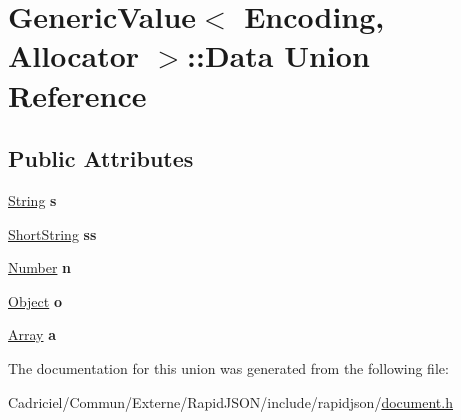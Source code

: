 \hypertarget{union_generic_value_1_1_data}{}\section{Generic\+Value$<$ Encoding, Allocator $>$\+:\+:Data Union Reference}
\label{union_generic_value_1_1_data}
\subsection*{Public Attributes}
\begin{DoxyCompactItemize}
\item 
\hyperlink{struct_generic_value_1_1_string}{String} {\bfseries s}\hypertarget{union_generic_value_1_1_data_a6872a4b93763944063b425e6c001ed2b}{}\label{union_generic_value_1_1_data_a6872a4b93763944063b425e6c001ed2b}

\item 
\hyperlink{struct_generic_value_1_1_short_string}{Short\+String} {\bfseries ss}\hypertarget{union_generic_value_1_1_data_a410e39a5dc296eb3b152b54193740e4c}{}\label{union_generic_value_1_1_data_a410e39a5dc296eb3b152b54193740e4c}

\item 
\hyperlink{union_generic_value_1_1_number}{Number} {\bfseries n}\hypertarget{union_generic_value_1_1_data_a243007cce2f4b75bea3e3c1ee4c3c239}{}\label{union_generic_value_1_1_data_a243007cce2f4b75bea3e3c1ee4c3c239}

\item 
\hyperlink{struct_generic_value_1_1_object}{Object} {\bfseries o}\hypertarget{union_generic_value_1_1_data_a15c6847aa3272560aaff5e7ed4320a7f}{}\label{union_generic_value_1_1_data_a15c6847aa3272560aaff5e7ed4320a7f}

\item 
\hyperlink{struct_generic_value_1_1_array}{Array} {\bfseries a}\hypertarget{union_generic_value_1_1_data_a1935b99b33ec9deff9f6360f8fa7b812}{}\label{union_generic_value_1_1_data_a1935b99b33ec9deff9f6360f8fa7b812}

\end{DoxyCompactItemize}


The documentation for this union was generated from the following file\+:\begin{DoxyCompactItemize}
\item 
Cadriciel/\+Commun/\+Externe/\+Rapid\+J\+S\+O\+N/include/rapidjson/\hyperlink{document_8h}{document.\+h}\end{DoxyCompactItemize}
